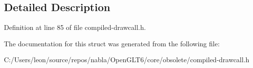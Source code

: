 \subsection{Detailed Description}


Definition at line 85 of file compiled-\/drawcall.\+h.



The documentation for this struct was generated from the following file\+:\begin{DoxyCompactItemize}
\item 
C\+:/\+Users/leon/source/repos/nabla/\+Open\+G\+L\+T6/core/obsolete/compiled-\/drawcall.\+h\end{DoxyCompactItemize}
